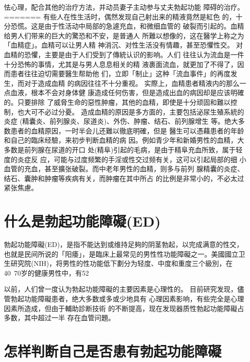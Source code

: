 \documentclass[12pt,UTF8]{ctexbook}
\begin{document}
怯心理，配合其他的治疗方法，并动员妻子主动参与丈夫勃起功能
障碍的治疗。
=======
有些人在性生活时，偶然发现自己射出来的精液竟然是紅色
的，十分恐慌。这是由于性活动中局部的急遽充血，和微细血管的
破裂而引起的。血精给男人们带来的巨大的驚恐和不安，是普通人
所難以想像的，这在醫学上称之为「血精症」。血精可以让男人精
神消沉、对性生活没有情趣，甚至恐懼性交。
对血精的恐懼，主要是由于人们受到了傳統认识的影响。人们
往往认为流血是一件十分恐怖的事情，尤其是与男人息息相关的精
液裹面流血，就更加了不得了，因而患者往往迫切需要醫生帮助他
们，立即「制止」这种「流血事件」的再度发生，而对于造成血精
的病因往往不十分重视。
实際上，血精患者精液内的那么一点血液，根本不会对身体健
康造成任何伤害，但是造成出血的病因却是应该明確的。只要排除
了威脅生命的惡性肿瘤，其他的血精，即使是十分顽固和難以控
制，也大可不必过分憂。
造成血精的原因是多方面的，主要包括泌尿生殖系統的炎症
(精囊炎、前列腺炎、尿道炎)、外伤、肿瘤、结石、前列腺增生
等。绝大多数患者的血精原因，一时半会儿还難以徹底明確，但是
醫生可以憑藉患者的年龄和自己的臨床经驗，来初步判断血精的病
因。例如青少年和新婚男性的血精，大多数是前列腺在尿道的开口
处(精阜)引起的毛病，是由于精阜充血所致，属于轻度的炎症反
应，可能与过度频繁的手淫或性交过频有关，这可以引起局部的细
小血管的充血，甚至擴张破裂。而中老年男性的血精，则多与前列
腺精囊的炎症、结石、囊肿和肿瘤等疾病有关，而肿瘤在其中所占
的比例是非常小的，不必太过紧张焦慮。

\section{什么是勃起功能障礙(ED)}

勃起功能障礙(ED)，是指不能达到或维持足夠的阴茎勃起，以完成满意的性交，也就是民间所说的「阳痿」，是臨床上最常见的男性性功能障礙之一。美國國立卫生研究院(NIH)，将男性的性功能低下劃分为轻度、中度和重度三个級別，在40~70岁的健康男性中，有52%

以前，人们曾一度认为勃起功能障礙的主要因素是心理性的。
目前研究发现，儘管勃起功能障礙患者，绝大多数或多或少地具有
心理因素影响，有些完全是心理因素所造成，但由于輔助診断技術
的不断提高，现在发现器质性勃起功能障礙占多数，其中超过一半
存在血管问題。

\section{怎样判断自己是否患有勃起功能障礙}
\end{document}
